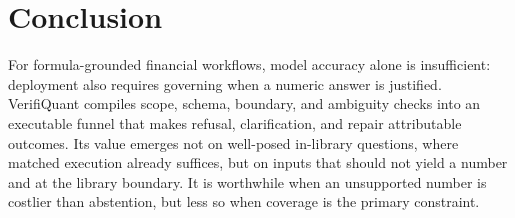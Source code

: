 \documentclass[sigconf,anonymous]{acmart}
\begin{document}
\section{Conclusion}
For formula-grounded financial workflows, model accuracy alone is insufficient: deployment also requires governing when a numeric answer is justified. VerifiQuant compiles scope, schema, boundary, and ambiguity checks into an executable funnel that makes refusal, clarification, and repair attributable outcomes. Its value emerges not on well-posed in-library questions, where matched execution already suffices, but on inputs that should not yield a number and at the library boundary. It is worthwhile when an unsupported number is costlier than abstention, but less so when coverage is the primary constraint.



\end{document}
